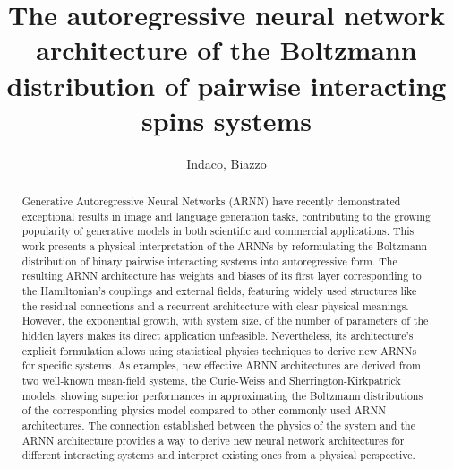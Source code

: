 \documentclass[aps,physrev,10pt,floatfix,reprint]{revtex4-2}
\begin{document}
\title{The autoregressive neural network architecture of the Boltzmann distribution of pairwise interacting spins systems}
\author{Indaco, Biazzo}

\begin{abstract}
    Generative Autoregressive Neural Networks (ARNN) have recently demonstrated exceptional results in image and language generation tasks, contributing to the growing popularity of generative models in both scientific and commercial applications. This work presents a physical interpretation of the ARNNs by reformulating the Boltzmann distribution of binary pairwise interacting systems into autoregressive form. The resulting ARNN architecture has weights and biases of its first layer corresponding to the Hamiltonian's couplings and external fields, featuring widely used structures like the residual connections and a recurrent architecture with clear physical meanings. However, the exponential growth, with system size, of the number of parameters of the hidden layers makes its direct application unfeasible. Nevertheless, its architecture's explicit formulation allows using statistical physics techniques to derive new ARNNs for specific systems. As examples, new effective ARNN architectures are derived from two well-known mean-field systems, the Curie-Weiss and Sherrington-Kirkpatrick models, showing superior performances in approximating the Boltzmann distributions of the corresponding physics model compared to other commonly used ARNN architectures. The connection established between the physics of the system and the ARNN architecture provides a way to derive new neural network architectures for different interacting systems and interpret existing ones from a physical perspective.
\end{abstract}
    
    
\maketitle
\tableofcontents
\end{document}
